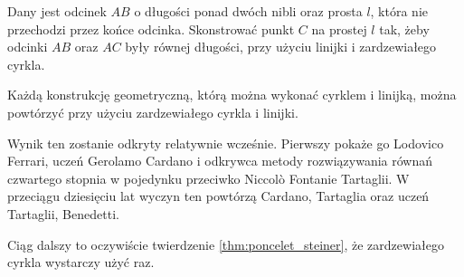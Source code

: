\begin{geoconstruction}
    Dany jest odcinek $AB$ o długości ponad dwóch nibli oraz prosta $l$, która nie przechodzi przez końce odcinka.
    Skonstrować punkt $C$ na prostej $l$ tak, żeby odcinki $AB$ oraz $AC$ były równej długości, przy użyciu linijki i zardzewiałego cyrkla.
\end{geoconstruction}

\begin{proposition}
\label{broken_ruler_compass_hartshorne_end}%
    Każdą konstrukcję geometryczną, którą można wykonać cyrklem i linijką, można powtórzyć przy użyciu zardzewiałego cyrkla i linijki.
\end{proposition}

Wynik ten zostanie odkryty relatywnie wcześnie.
Pierwszy pokaże go Lodovico Ferrari, uczeń Gerolamo Cardano i odkrywca metody rozwiązywania równań czwartego stopnia w pojedynku przeciwko Niccolò Fontanie Tartaglii.
W przeciągu dziesięciu lat wyczyn ten powtórzą Cardano, Tartaglia oraz uczeń Tartaglii, Benedetti.

Ciąg dalszy to oczywiście twierdzenie \ref{thm:poncelet_steiner}, że zardzewiałego cyrkla wystarczy użyć raz.

%
